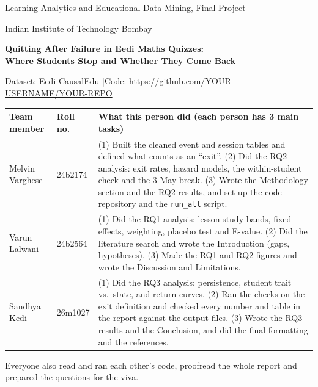 \documentclass[11pt,a4paper]{article}
\newcommand{\repourl}{https://github.com/YOUR-USERNAME/YOUR-REPO}   %
\begin{document}
\begin{titlepage}\thispagestyle{empty}
\centering\vspace*{0.8cm}
{\large Learning Analytics and Educational Data Mining, Final Project\par}\vspace{0.2cm}
{\large Indian Institute of Technology Bombay\par}\vspace{1.2cm}
{\LARGE\bfseries Quitting After Failure in Eedi Maths Quizzes:\\[4pt] Where Students Stop and Whether They Come Back\par}\vspace{0.7cm}
{\normalsize Dataset: Eedi CausalEdu \quad|\quad Code: \url{\repourl}\par}\vspace{1.0cm}
\renewcommand{\arraystretch}{1.25}
\begin{tabular}{@{}>{\raggedright}p{3.0cm}>{\raggedright}p{1.9cm}p{10.2cm}@{}}
\toprule
\textbf{Team member} & \textbf{Roll no.} & \textbf{What this person did (each person has 3 main tasks)}\\
\midrule
Melvin Varghese & 24b2174 &
(1) Built the cleaned event and session tables and defined what counts as an ``exit''.
(2) Did the RQ2 analysis: exit rates, hazard models, the within-student check and the 3 May break.
(3) Wrote the Methodology section and the RQ2 results, and set up the code repository and the \texttt{run\_all} script.\\[3pt]
Varun Lalwani & 24b2564 &
(1) Did the RQ1 analysis: lesson study bands, fixed effects, weighting, placebo test and E-value.
(2) Did the literature search and wrote the Introduction (gaps, hypotheses).
(3) Made the RQ1 and RQ2 figures and wrote the Discussion and Limitations.\\[3pt]
Sandhya Kedi & 26m1027 &
(1) Did the RQ3 analysis: persistence, student trait vs.\ state, and return curves.
(2) Ran the checks on the exit definition and checked every number and table in the report against the output files.
(3) Wrote the RQ3 results and the Conclusion, and did the final formatting and the references.\\
\bottomrule
\end{tabular}\par\vspace{0.4cm}
\begin{minipage}{0.9\textwidth}\small\centering
Everyone also read and ran each other's code, proofread the whole report and prepared the questions for the viva.
\end{minipage}
\vfill
\end{titlepage}
\end{document}
